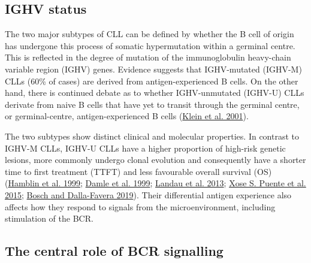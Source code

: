\documentclass[11pt, a4paper, twosided]{book}
\begin{document}
\hypertarget{intro-ighv-status}{%
\subsection{IGHV status}\label{intro-ighv-status}}

The two major subtypes of CLL can be defined by whether the B cell of origin has undergone this process of somatic hypermutation within a germinal centre. This is reflected in the degree of mutation of the immunoglobulin heavy-chain variable region (IGHV) genes. Evidence suggests that IGHV-mutated (IGHV-M) CLLs (60\% of cases) are derived from antigen-experienced B cells. On the other hand, there is continued debate as to whether IGHV-unmutated (IGHV-U) CLLs derivate from naive B cells that have yet to transit through the germinal centre, or germinal-centre, antigen-experienced B cells (\protect\hyperlink{ref-Klein2001}{Klein et al. 2001}).

The two subtypes show distinct clinical and molecular properties. In contrast to IGHV-M CLLs, IGHV-U CLLs have a higher proportion of high-risk genetic lesions, more commonly undergo clonal evolution and consequently have a shorter time to first treatment (TTFT) and less favourable overall survival (OS) (\protect\hyperlink{ref-Hamblin1999}{Hamblin et al. 1999}; \protect\hyperlink{ref-Damle1999}{Damle et al. 1999}; \protect\hyperlink{ref-Landau2013}{Landau et al. 2013}; \protect\hyperlink{ref-Puente2015}{Xose S. Puente et al. 2015}; \protect\hyperlink{ref-Bosch2019}{Bosch and Dalla-Favera 2019}). Their differential antigen experience also affects how they respond to signals from the microenvironment, including stimulation of the BCR.

\hypertarget{intro-bcr-signalling}{%
\subsection{The central role of BCR signalling}\label{intro-bcr-signalling}}
\end{document}
